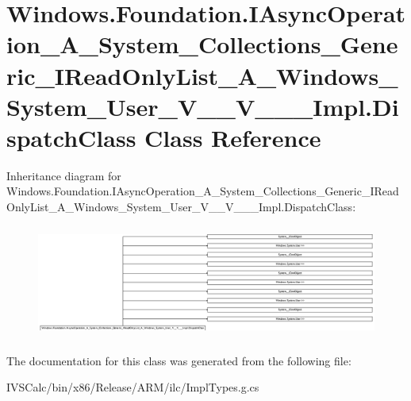 \hypertarget{class_windows_1_1_foundation_1_1_i_async_operation___a___system___collections___generic___i_readdccdc86b1b76c60f00a7e5fc1faad4b9}{}\section{Windows.\+Foundation.\+I\+Async\+Operation\+\_\+\+A\+\_\+\+System\+\_\+\+Collections\+\_\+\+Generic\+\_\+\+I\+Read\+Only\+List\+\_\+\+A\+\_\+\+Windows\+\_\+\+System\+\_\+\+User\+\_\+\+V\+\_\+\+\_\+\+V\+\_\+\+\_\+\+\_\+\+Impl.\+Dispatch\+Class Class Reference}
\label{class_windows_1_1_foundation_1_1_i_async_operation___a___system___collections___generic___i_readdccdc86b1b76c60f00a7e5fc1faad4b9}
Inheritance diagram for Windows.\+Foundation.\+I\+Async\+Operation\+\_\+\+A\+\_\+\+System\+\_\+\+Collections\+\_\+\+Generic\+\_\+\+I\+Read\+Only\+List\+\_\+\+A\+\_\+\+Windows\+\_\+\+System\+\_\+\+User\+\_\+\+V\+\_\+\+\_\+\+V\+\_\+\+\_\+\+\_\+\+Impl.\+Dispatch\+Class\+:\begin{figure}[H]
\begin{center}
\leavevmode
\includegraphics[height=3.737864cm]{class_windows_1_1_foundation_1_1_i_async_operation___a___system___collections___generic___i_readdccdc86b1b76c60f00a7e5fc1faad4b9}
\end{center}
\end{figure}


The documentation for this class was generated from the following file\+:\begin{DoxyCompactItemize}
\item 
I\+V\+S\+Calc/bin/x86/\+Release/\+A\+R\+M/ilc/Impl\+Types.\+g.\+cs\end{DoxyCompactItemize}
